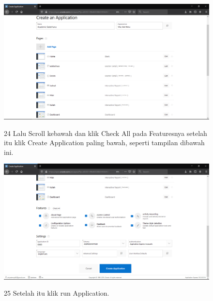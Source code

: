 \begin{enumerate}
\begin{figure}
    \begin{center}
\includegraphics[scale=0.2]{figures/37.png}
    \caption{\textit{}}
        \end{center}
\label{gambar}
\end{figure}


\begin{figure}
\item[24]Lalu Scroll kebawah dan klik Check All pada Featuresnya setelah itu klik Create Application paling bawah, seperti tampilan dibawah ini.

    \begin{center}
\includegraphics[scale=0.2]{figures/38.png}
    \caption{\textit{}}
        \end{center}
\label{gambar}
\end{figure}


\begin{figure}
\item[25]Setelah itu klik run Application.


\end{figure}
\end{enumerate}
